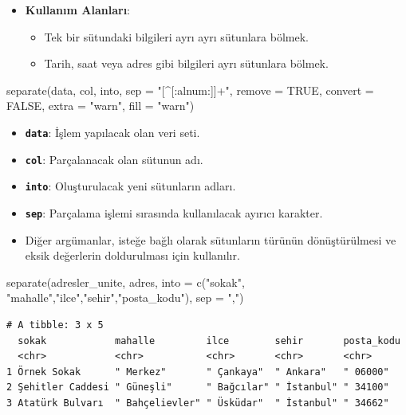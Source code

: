 \documentclass[
  letterpaper,
  DIV=11,
  numbers=noendperiod]{scrreprt}
\newenvironment{Shaded}{\begin{snugshade}}{\end{snugshade}}
\newcommand{\AttributeTok}[1]{\textcolor[rgb]{0.40,0.45,0.13}{#1}}
\newcommand{\ConstantTok}[1]{\textcolor[rgb]{0.56,0.35,0.01}{#1}}
\newcommand{\FunctionTok}[1]{\textcolor[rgb]{0.28,0.35,0.67}{#1}}
\newcommand{\NormalTok}[1]{\textcolor[rgb]{0.00,0.23,0.31}{#1}}
\newcommand{\StringTok}[1]{\textcolor[rgb]{0.13,0.47,0.30}{#1}}
\begin{document}
\begin{itemize}
\item
  \textbf{Kullanım Alanları}:

  \begin{itemize}
  \item
    Tek bir sütundaki bilgileri ayrı ayrı sütunlara bölmek.
  \item
    Tarih, saat veya adres gibi bilgileri ayrı sütunlara bölmek.
  \end{itemize}
\end{itemize}

\begin{Shaded}
\begin{Highlighting}[]
\FunctionTok{separate}\NormalTok{(data, col, into, }\AttributeTok{sep =} \StringTok{"[\^{}[:alnum:]]+"}\NormalTok{, }\AttributeTok{remove =} \ConstantTok{TRUE}\NormalTok{, }\AttributeTok{convert =} \ConstantTok{FALSE}\NormalTok{, }\AttributeTok{extra =} \StringTok{"warn"}\NormalTok{, }\AttributeTok{fill =} \StringTok{"warn"}\NormalTok{)}
\end{Highlighting}
\end{Shaded}

\begin{itemize}
\item
  \textbf{\texttt{data}}: İşlem yapılacak olan veri seti.
\item
  \textbf{\texttt{col}}: Parçalanacak olan sütunun adı.
\item
  \textbf{\texttt{into}}: Oluşturulacak yeni sütunların adları.
\item
  \textbf{\texttt{sep}}: Parçalama işlemi sırasında kullanılacak ayırıcı
  karakter.
\item
  Diğer argümanlar, isteğe bağlı olarak sütunların türünün
  dönüştürülmesi ve eksik değerlerin doldurulması için kullanılır.
\end{itemize}

\begin{Shaded}
\begin{Highlighting}[]
\FunctionTok{separate}\NormalTok{(adresler\_unite, adres, }\AttributeTok{into =} \FunctionTok{c}\NormalTok{(}\StringTok{"sokak"}\NormalTok{, }\StringTok{"mahalle"}\NormalTok{,}\StringTok{"ilce"}\NormalTok{,}\StringTok{"sehir"}\NormalTok{,}\StringTok{"posta\_kodu"}\NormalTok{), }\AttributeTok{sep =} \StringTok{","}\NormalTok{)}
\end{Highlighting}
\end{Shaded}

\begin{verbatim}
# A tibble: 3 x 5
  sokak            mahalle         ilce        sehir       posta_kodu
  <chr>            <chr>           <chr>       <chr>       <chr>     
1 Örnek Sokak      " Merkez"       " Çankaya"  " Ankara"   " 06000"  
2 Şehitler Caddesi " Güneşli"      " Bağcılar" " İstanbul" " 34100"  
3 Atatürk Bulvarı  " Bahçelievler" " Üsküdar"  " İstanbul" " 34662"  
\end{verbatim}
\end{document}
